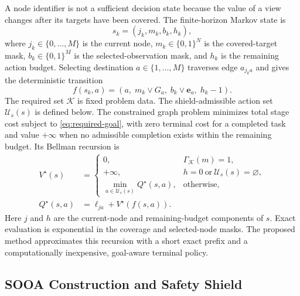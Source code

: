 \documentclass{IEEEtaes}
\theoremstyle{remark}
\theoremstyle{plain}
\begin{document}
A node identifier is not a sufficient decision state because the value of a view changes after its targets have been covered. The finite-horizon Markov state is
\begin{equation}
  s_k=(j_k,m_k,b_k,h_k),
  \label{eq:mdp-state}
\end{equation}
where $j_k\in\{0,\ldots,M\}$ is the current node, $m_k\in\{0,1\}^{N}$ is the covered-target mask, $b_k\in\{0,1\}^{M}$ is the selected-observation mask, and $h_k$ is the remaining action budget. Selecting destination $a\in\{1,\ldots,M\}$ traverses edge $a_{j_ka}$ and gives the deterministic transition
\begin{equation}
  f(s_k,a)=\left(a,\;m_k\lor G_a,\;b_k\lor\mathbf e_a,\;h_k-1\right).
  \label{eq:mdp-transition}
\end{equation}
The required set $\mathcal K$ is fixed problem data. The shield-admissible action set $\mathcal U_s(s)$ is defined below. The constrained graph problem minimizes total stage cost subject to \eqref{eq:required-goal}, with zero terminal cost for a completed task and value $+\infty$ when no admissible completion exists within the remaining budget. Its Bellman recursion is
\begin{equation}
  \begin{aligned}
  V^\star(s)&=
    \begin{cases}
    0, & \Gamma_{\mathcal K}(m)=1,\\
    +\infty, & h=0\ \text{or}\ \mathcal U_s(s)=\varnothing,\\
    \min\limits_{a\in\mathcal U_s(s)}
      Q^\star(s,a), & \text{otherwise},
    \end{cases}\\
  Q^\star(s,a)&=\ell_{j a}+V^\star(f(s,a)).
  \end{aligned}
  \label{eq:bellman}
\end{equation}
Here $j$ and $h$ are the current-node and remaining-budget components of $s$. Exact evaluation is exponential in the coverage and selected-node masks. The proposed method approximates this recursion with a short exact prefix and a computationally inexpensive, goal-aware terminal policy.

\subsection{SOOA Construction and Safety Shield}
\end{document}
